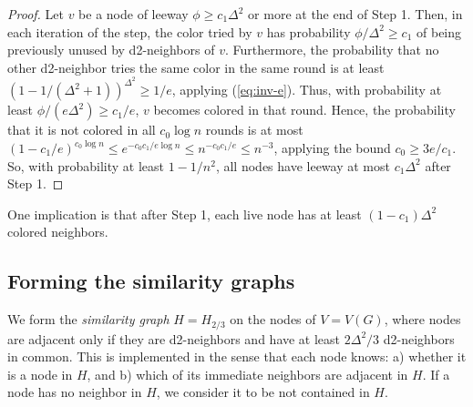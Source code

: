 \begin{proof}
Let $v$ be a node of leeway $\phi \ge c_1 \Delta^2$ or more at the end of Step 1.
Then, in each iteration of the step, the color tried by $v$ has probability $\phi/\Delta^2 \ge c_1$ of being previously unused by d2-neighbors of $v$. Furthermore, the probability that no other d2-neighbor tries the same color in the same round is at least $(1-1/(\Delta^2+1))^{\Delta^2} \ge 1/e$, applying (\ref{eq:inv-e}). Thus,
with probability at least $\phi/(e \Delta^2) \ge c_1/e$, $v$ becomes colored in that round. Hence, the probability that it is not colored in all $c_0 \log n$ rounds is at most $(1-c_1/e)^{c_0\log n} \le e^{-c_0 c_1/e \log n} \le n^{-c_0 c_1/e} \le n^{-3}$, applying the bound $c_0 \ge 3e/c_1$.
So, with probability at least $1-1/n^2$, all nodes have leeway at most $c_1 \Delta^2$ after Step 1.
\end{proof}

One implication is that after Step 1, each live node has at least $(1-c_1)\Delta^2$ colored neighbors.  



\subsection{Forming the similarity graphs} 

We form the \emph{similarity graph} $H = H_{2/3}$ on the nodes of $V = V(G)$, where nodes are adjacent only if they are d2-neighbors and have at least $2\Delta^2/3$ d2-neighbors in common.
This is implemented in the sense that each node knows:
a) whether it is a node in $H$, and
b) which of its immediate neighbors are adjacent in $H$.
If a node has no neighbor in $H$, we consider it to be not contained in $H$.

